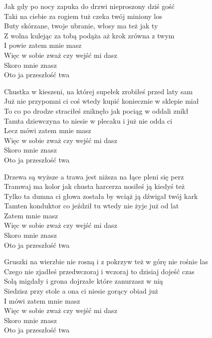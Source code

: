 \begin{text}
    \begin{tinyTwo}
    Jak gdy po nocy zapuka do drzwi nieproszony dziś gość\\
    Taki na ciebie za rogiem tuż czeka twój miniony los\\
    Buty skórzane, twoje ubranie, włosy ma też jak ty\\
    Z wolna kulejąc za tobą podąża aż krok zrówna z twym\\
    I powie zatem mnie masz\\
    Więc w sobie zważ czy wejść mi dasz\\
    Skoro mnie znasz\\
    Oto ja przeszłość twa

    Chustka w kieszeni, na której supełek zrobiłeś przed laty sam\\
    Już nie przypomni ci coś wtedy kupić koniecznie w sklepie miał\\
    To co po drodze straciłeś zniknęło jak pociąg w oddali znikł\\
    Tamta dziewczyna to niesie w plecaku i już nie odda ci\\
    Lecz mówi zatem mnie masz\\
    Więc w sobie zważ czy wejść mi dasz\\
    Skoro mnie znasz\\
    Oto ja przeszłość twa

    Drzewa są wyższe a trawa jest niższa na łące pleni się perz\\
    Tramwaj ma kolor jak chusta harcerza nosiłeś ją kiedyś też\\
    Tylko ta dumna ci głowa została by wciąż ją dźwigał twój kark\\
    Tamten konduktor co jeździł tu wtedy nie żyje już od lat\\
    Zatem mnie masz\\
    Więc w sobie zważ czy wejść mi dasz\\
    Skoro mnie znasz\\
    Oto ja przeszłość twa

    Gruszki na wierzbie nie rosną i z pokrzyw też w górę nie rośnie las\\
    Czego nie zjadłeś przedwczoraj i wczoraj to dzisiaj dojeść czas\\
    Solą migdały i grona dojrzałe które zanurzasz w nią\\
    Siedzisz przy stole a ona ci niesie gorący obiad już\\
    I mówi zatem mnie masz\\
    Więc w sobie zważ czy wejść mi dasz\\
    Skoro mnie znasz\\
    Oto ja przeszłość twa


\end{tinyTwo}
\end{text}
